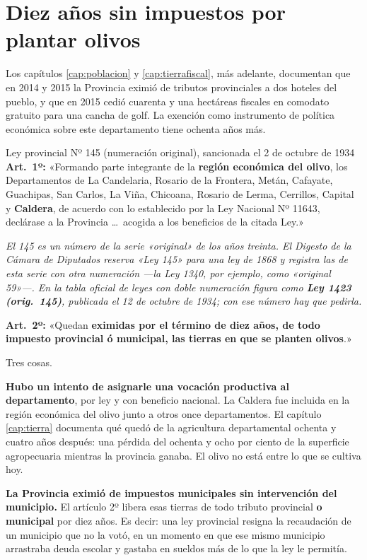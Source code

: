 \section{Diez años sin impuestos por plantar olivos}

Los capítulos \ref{cap:poblacion} y \ref{cap:tierrafiscal}, más adelante, documentan que en 2014 y 2015 la Provincia eximió de tributos provinciales a
dos hoteles del pueblo, y que en 2015 cedió cuarenta y una hectáreas fiscales en comodato
gratuito para una cancha de golf. La exención como instrumento de política económica sobre
este departamento tiene ochenta años más.

\begin{ficha}{Ley provincial Nº 145 (numeración original), sancionada el 2 de octubre de 1934}
\textbf{Art.\ 1º:} «Formando parte integrante de la \textbf{región económica del olivo}, los
Departamentos de La Candelaria, Rosario de la Frontera, Metán, Cafayate, Guachipas, San
Carlos, La Viña, Chicoana, Rosario de Lerma, Cerrillos, Capital y \textbf{Caldera}, de acuerdo
con lo establecido por la Ley Nacional Nº 11643, declárase a la Provincia \ldots\ acogida a
los beneficios de la citada Ley.»\par\textit{El 145 es un número de la serie «original» de los años treinta. El Digesto de la Cámara de Diputados reserva «Ley 145» para una ley de 1868 y registra las de esta serie con otra numeración ---la Ley 1340, por ejemplo, como «original 59»---. En la tabla oficial de leyes con doble numeración figura como \textbf{Ley 1423 (orig.\ 145)}, publicada el 12 de octubre de 1934; con ese número hay que pedirla.}

\textbf{Art.\ 2º:} «Quedan \textbf{eximidas por el término de diez años, de todo impuesto
provincial ó municipal, las tierras en que se planten olivos}.»
\end{ficha}

Tres cosas.

\textbf{Hubo un intento de asignarle una vocación productiva al departamento}, por ley y con
beneficio nacional. La Caldera fue incluida en la región económica del olivo junto a otros
once departamentos. El capítulo \ref{cap:tierra} documenta qué quedó de la agricultura departamental
ochenta y cuatro años después: una pérdida del ochenta y ocho por ciento de la superficie
agropecuaria mientras la provincia ganaba. El olivo no está entre lo que se cultiva hoy.

\textbf{La Provincia eximió de impuestos municipales sin intervención del municipio.} El
artículo 2º libera esas tierras de todo tributo provincial \textbf{o municipal} por diez
años. Es decir: una ley provincial resigna la recaudación de un municipio que no la votó, en
un momento en que ese mismo municipio arrastraba deuda escolar y gastaba en sueldos más de
lo que la ley le permitía.

